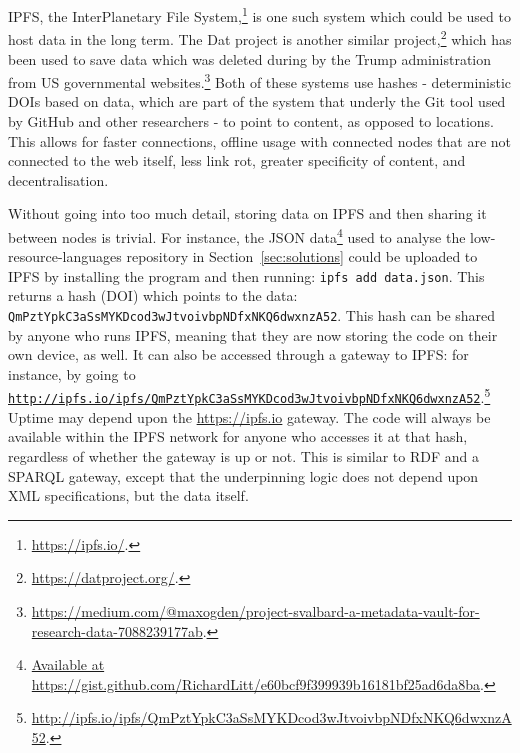 IPFS, the InterPlanetary File System,\footnote{\href{https://ipfs.io/}{https://ipfs.io/}. } is one such system which could be used to host data in the long term. The Dat project is another similar project,\footnote{\href{https://datproject.org/}{https://datproject.org/}. } which has been used to save data which was deleted during by the Trump administration from US governmental websites.\footnote{\href{https://medium.com/@maxogden/project-svalbard-a-metadata-vault-for-research-data-7088239177ab}{https://medium.com/@maxogden/project-svalbard-a-metadata-vault-for-research-data-7088239177ab}. } Both of these systems use hashes - deterministic DOIs based on data, which are part of the system that underly the Git tool used by GitHub and other researchers - to point to content, as opposed to locations. This allows for faster connections, offline usage with connected nodes that are not connected to the web itself, less link rot, greater specificity of content, and decentralisation.

Without going into too much detail, storing data on IPFS and then sharing it between nodes is trivial. For instance, the JSON data\footnote{\href{https://gist.github.com/RichardLitt/e60bcf9f399939b16181bf25ad6da8ba}{Available at https://gist.github.com/RichardLitt/e60bcf9f399939b16181bf25ad6da8ba}. } used to analyse the low-resource-languages repository in Section~\ref{sec:solutions} could be uploaded to IPFS by installing the program and then running: {\tt ipfs add data.json}. This returns a hash (DOI) which points to the data: {\tt QmPztYpkC3aSs\-MYKDcod\-3wJtvoivbp\-NDfxNKQ6dwxnzA52}. This hash can be shared by anyone who runs IPFS, meaning that they are now storing the code on their own device, as well. It can also be accessed through a gateway to IPFS: for instance, by going to \href{http://ipfs.io/ipfs/QmPztYpkC3aSsMYKDcod3wJtvoivbpNDfxNKQ6dwxnzA52}{\nolinkurl{http://ipfs.io/ipfs/QmPztYpkC3aSsMYKDcod3wJtvoivbpNDfxNKQ6dwxnzA52}}.\footnote{\href{http://ipfs.io/ipfs/QmPztYpkC3aSsMYKDcod3wJtvoivbpNDfxNKQ6dwxnzA52}{http://ipfs.io/ipfs/QmPztYpkC3aSsMYKDcod3wJtvoivbpNDfxNKQ6dwxnzA52}. } Uptime may depend upon the \href{https://ipfs.io}{https://ipfs.io} gateway. The code will always be available within the IPFS network for anyone who accesses it at that hash, regardless of whether the gateway is up or not. This is similar to RDF and a SPARQL gateway, except that the underpinning logic does not depend upon XML specifications, but the data itself.

